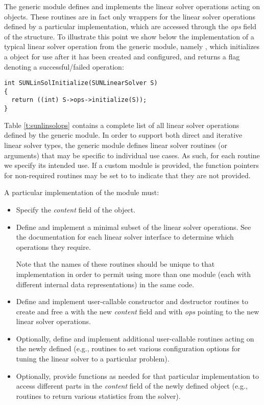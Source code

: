 The generic {\sunlinsol} module defines and implements the linear
solver operations acting on  objects.  These
routines are in fact only wrappers for the linear solver operations
defined by a particular {\sunlinsol} implementation, which are
accessed through the {\em ops} field of the 
structure. To illustrate this point we show below the implementation
of a typical linear solver operation from the generic {\sunlinsol}
module, namely , which initializes a
{\sunlinsol} object for use after it has been created and configured,
and returns a flag denoting a successful/failed operation:
\begin{verbatim}
int SUNLinSolInitialize(SUNLinearSolver S)
{
  return ((int) S->ops->initialize(S));
}
\end{verbatim}
Table \ref{t:sunlinsolops} contains a complete list of all linear
solver operations defined by the generic {\sunlinsol} module.  In
order to support both direct and iterative linear solver types, the
generic {\sunlinsol} module defines linear solver routines (or 
arguments) that may be specific to individual use cases.  As such,
for each routine we specify its intended use.  If a custom
{\sunlinsol} module is provided, the function pointers for
non-required routines may be set to  to indicate that they
are not provided.

A particular implementation of the {\sunlinsol} module must:
\begin{itemize}
\item Specify the {\em content} field of the  object.
\item Define and implement a minimal subset of the linear solver
  operations. See the documentation for each {\sundials} linear solver
  interface to determine which {\sunlinsol} operations they require.

  Note that the names of these routines should be unique to that
  implementation in order to permit using more than one {\sunlinsol}
  module (each with different  internal data
  representations) in the same code. 
\item Define and implement user-callable constructor and destructor
  routines to create and free a  with
  the new {\em content} field and with {\em ops} pointing to the
  new linear solver operations.
\item Optionally, define and implement additional user-callable routines
  acting on the newly defined  (e.g., routines to
  set various configuration options for tuning the linear solver to a
  particular problem).
\item Optionally, provide functions as needed for that particular
  implementation to access different parts in the {\em
  content} field of the newly defined  object
  (e.g., routines to return various statistics from the solver).
\end{itemize}

